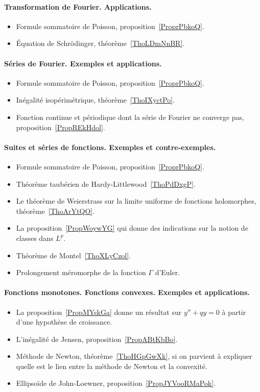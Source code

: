 \paragraph{Transformation de Fourier. Applications.}
\begin{itemize}
    \item Formule sommatoire de Poisson, proposition~\ref{ProprPbkoQ}.
    \item Équation de Schrödinger, théorème~\ref{ThoLDmNnBR}.
\end{itemize}

\paragraph{Séries de Fourier. Exemples et applications.}
\begin{itemize}
    \item Formule sommatoire de Poisson, proposition~\ref{ProprPbkoQ}.
    \item Inégalité isopérimétrique, théorème~\ref{ThoIXyctPo}.
    \item Fonction continue et périodique dont la série de Fourier ne converge pas, proposition~\ref{PropREkHdol}.
\end{itemize}

\paragraph{Suites et séries de fonctions. Exemples et contre-exemples.}
\begin{itemize}
    \item Formule sommatoire de Poisson, proposition~\ref{ProprPbkoQ}.
    \item Théorème taubérien de Hardy-Littlewood~\ref{ThoPdDxgP}.
    \item Le théorème de Weierstrass sur la limite uniforme de fonctions holomorphes, théorème~\ref{ThoArYtQO}.
    \item La proposition~\ref{PropWoywYG} qui donne des indications sur la notion de classes dans \( L^p\).
    \item Théorème de Montel~\ref{ThoXLyCzol}.
    \item Prolongement méromorphe de la fonction \( \Gamma\) d'Euler.
\end{itemize}

\paragraph{Fonctions monotones. Fonctions convexes. Exemples et applications.}
\begin{itemize}
    \item La proposition~\ref{PropMYskGa} donne un résultat sur \( y''+qy=0\) à partir d'une hypothèse de croissance.
    \item L'inégalité de Jensen, proposition~\ref{PropABtKbBo}.
    \item Méthode de Newton, théorème~\ref{ThoHGpGwXk}, si on parvient à expliquer quelle est le lien entre la méthode de Newton et la convexité.
    \item Ellipsoïde de John-Loewner, proposition~\ref{PropJYVooRMaPok}.
\end{itemize}

